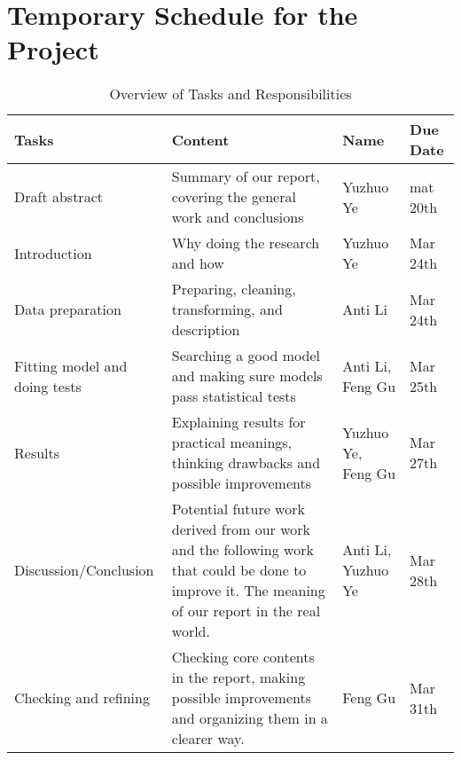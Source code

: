 \documentclass{article}
\begin{document}
\section{Temporary Schedule for the Project}
\begin{table}[h]
    \centering
    \begin{tabular}{|l|p{5cm}|l|l|}
        \hline
        \textbf{Tasks} & \textbf{Content} & \textbf{Name} & \textbf{Due Date} \\
        \hline
        Draft abstract & Summary of our report, covering the general work and conclusions & Yuzhuo Ye & mat 20th \\
        \hline
        Introduction & Why doing the research and how & Yuzhuo Ye & Mar 24th \\
        \hline
        Data preparation & Preparing, cleaning, transforming, and description & Anti Li & Mar 24th \\
        \hline
        Fitting model and doing tests & Searching a good model and making sure models pass statistical tests & Anti Li, Feng Gu & Mar 25th \\
        \hline
        Results & Explaining results for practical meanings, thinking drawbacks and possible improvements & Yuzhuo Ye, Feng Gu & Mar 27th \\
        \hline
        Discussion/Conclusion & Potential future work derived from our work and the following work that could be done to improve it. The meaning of our report in the real world. & Anti Li, Yuzhuo Ye & Mar 28th \\
        \hline
        Checking and refining & Checking core contents in the report, making possible improvements and organizing them in a clearer way. & Feng Gu & Mar 31th \\
        \hline
    \end{tabular}
    \caption{Overview of Tasks and Responsibilities}
\end{table}
\end{document}
